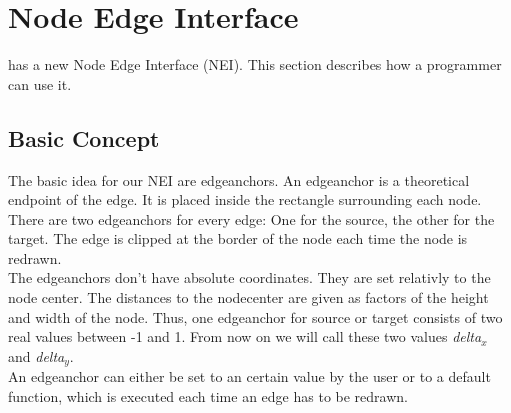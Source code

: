 \documentclass[twoside,fleqn]{report}
\begin{document}
\setlength{\parindent}{0pt} 
\sloppy




\tableofcontents

\chapter{Node Edge Interface}

\Graphlet{} has a new Node Edge Interface (NEI).
This section describes how a programmer can use it.


\section{Basic Concept}
\label{chap:ea_introduction}

The basic idea for our NEI are edgeanchors.
An edgeanchor is a theoretical endpoint of the edge. It is placed
inside the rectangle surrounding each node.
There are two edgeanchors for every edge: One for the source, the other 
for the target.
The edge is clipped at the border of the node each time the node is 
redrawn.\\

The edgeanchors don't have absolute coordinates. They are set 
relativly to the node center.
The distances to the nodecenter are given as factors of the 
height and width of the node.
Thus, one edgeanchor for source or target consists of two real values 
between -1 and 1. From now on we will call these two values 
\emph{delta$_x$} and \emph{delta$_y$}.\\


An edgeanchor can either be set to an certain value by the user 
or to a default function, which is executed each time an edge has to be 
redrawn.



\end{document}

